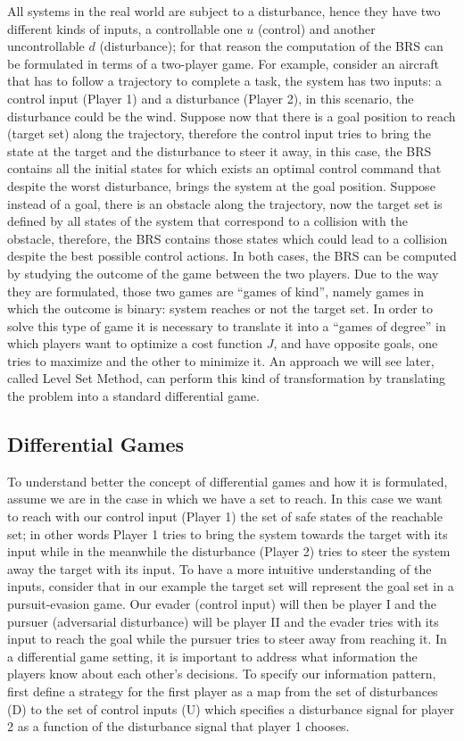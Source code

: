 All systems in the real world are subject to a disturbance, hence they have two different kinds of inputs, a controllable one $u$ (control) and another uncontrollable $d$ (disturbance); for that reason the computation of the BRS can be formulated in terms of a two-player game. For example, consider an aircraft that has to follow a trajectory to complete a task, the system has two inputs: a control input (Player 1) and a disturbance (Player 2), in this scenario, the disturbance could be the wind. Suppose now that there is a goal position to reach (target set) along the trajectory, therefore the control input tries to bring the state at the target and the disturbance to steer it away, in this case, the BRS contains all the initial states for which exists an optimal control command that despite the worst disturbance, brings the system at the goal position. Suppose instead of a goal, there is an obstacle along the trajectory, now the target set is defined by all states of the system that correspond to a collision with the obstacle, therefore, the BRS contains those states which could lead to a collision despite the best possible control actions. In both cases, the BRS can be computed by studying the outcome of the game between the two players. Due to the way they are formulated, those two games are “games of kind”, namely games in which the outcome is binary: system reaches or not the target set. In order to solve this type of game it is necessary to translate it into a “games of degree” in which players want to optimize a cost function $J$, and have opposite goals, one tries to maximize and the other to minimize it. An approach we will see later, called Level Set Method, can perform this kind of transformation by translating the problem into a standard differential game.

\subsection{Differential Games}
To understand better the concept of differential games and how it is formulated, assume we are in the case in which we have a set to reach. In this case we want to reach with our control input (Player 1) the set of safe states of the reachable set; in other words Player 1 tries to bring the system towards the target with its input while in the meanwhile the disturbance (Player 2) tries to steer the system away the target with its input. To have a  more intuitive understanding of the inputs, consider that in our example the target set will represent the goal set in a pursuit-evasion game. Our evader (control input) will then be player I and the pursuer (adversarial disturbance) will be player II and the evader tries with its input to reach the goal while the pursuer tries to steer away from reaching it.
In a differential game setting, it is important to address what information the players know about each other's decisions. To specify our information pattern, first define a strategy for the first player as a map  from the set of disturbances (D) to the set of control inputs (U)  which specifies a disturbance signal for player 2 as a function of the disturbance signal that player 1 chooses.

